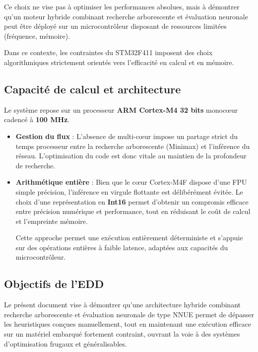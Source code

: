 \documentclass[11pt, a4paper]{article}
\begin{document}
Ce choix ne vise pas à optimiser les performances absolues, mais à démontrer qu’un moteur hybride combinant recherche arborescente et évaluation neuronale peut être déployé sur un microcontrôleur disposant de ressources limitées (fréquence, mémoire).

Dans ce contexte, les contraintes du STM32F411 imposent des choix algorithmiques strictement orientés vers l’efficacité en calcul et en mémoire.

\subsection{Capacité de calcul et architecture}
Le système repose sur un processeur \textbf{ARM Cortex-M4 32 bits} monocœur cadencé à \textbf{100 MHz}. 

\begin{itemize}
    \item \textbf{Gestion du flux} : L'absence de multi-cœur impose un partage strict du temps processeur entre la recherche arborescente (Minimax) et l'inférence du réseau. L'optimisation du code est donc vitale au maintien de la profondeur de recherche.
    \item \textbf{Arithm\'etique enti\`ere} : Bien que le c\oe ur Cortex-M4F dispose d'une FPU simple pr\'ecision, l'inf\'erence en virgule flottante est d\'elib\'er\'ement \'evit\'ee. Le choix d'une repr\'esentation en \textbf{Int16} permet d'obtenir un compromis efficace entre pr\'ecision num\'erique et performance, tout en r\'eduisant le co\^ut de calcul et l'empreinte m\'emoire.

Cette approche permet une ex\'ecution enti\`erement d\'eterministe et s'appuie sur des op\'erations enti\`eres \`a faible latence, adapt\'ees aux capacit\'es du microcontr\^oleur.
\end{itemize}

\subsection{Objectifs de l'EDD}
Le présent document vise à démontrer qu'une architecture hybride combinant recherche arborescente et évaluation neuronale de type NNUE permet de dépasser les heuristiques conçues manuellement, tout en maintenant une exécution efficace sur un matériel embarqué fortement contraint, ouvrant la voie à des systèmes d'optimisation frugaux et généralisables.
\end{document}

